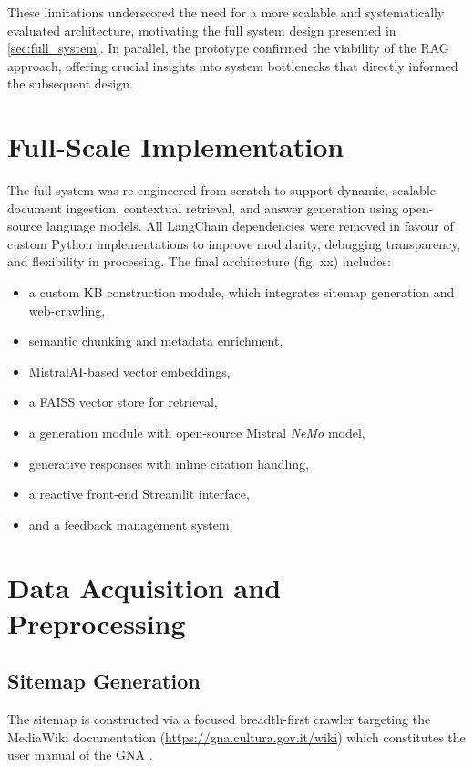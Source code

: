 \begin{spacing}{1.5}
These limitations underscored the need for a more scalable and systematically evaluated architecture, motivating the full system design presented in \autoref{sec:full_system}. In parallel, the prototype confirmed the viability of the RAG approach, offering crucial insights into system bottlenecks that directly informed the subsequent design.


\section{Full-Scale Implementation}\label{sec:full_system}
The full system was re-engineered from scratch to support dynamic, scalable document ingestion, contextual retrieval, and answer generation using open-source language models. All LangChain dependencies were removed in favour of custom Python implementations to improve modularity, debugging transparency, and flexibility in processing. The final architecture (fig. xx) includes:
\begin{itemize}
      \item a custom KB construction module, which integrates sitemap generation and web-crawling,
      \item semantic chunking and metadata enrichment,
      \item MistralAI-based vector embeddings,
      \item a FAISS vector store for retrieval,
      \item a generation module with open-source Mistral \textit{NeMo} model,
      \item generative responses with inline citation handling,
      \item a reactive front-end Streamlit interface,
      \item and a feedback management system.
\end{itemize}

\sloppy
\section{Data Acquisition and Preprocessing}
\subsection{Sitemap Generation}
The sitemap is constructed via a focused breadth-first crawler targeting the MediaWiki documentation (\url{https://gna.cultura.gov.it/wiki}) which constitutes the user manual of the GNA \citep{mic_mic_2019}. 


\end{spacing}
